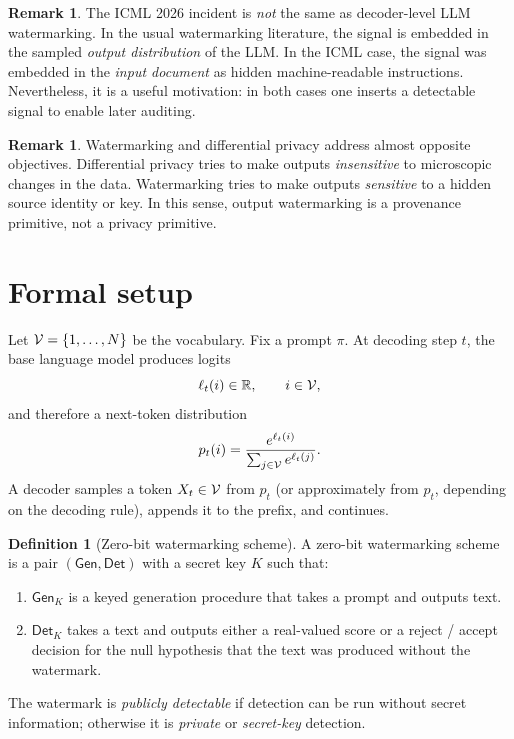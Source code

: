 \documentclass[11pt]{article}
\theoremstyle{definition}
\newtheorem{definition}[theorem]{Definition}
\newtheorem{remark}[theorem]{Remark}
\newcommand{\1}{\mathbf{1}}
\begin{document}
\begin{remark}
The ICML 2026 incident is \emph{not} the same as decoder-level LLM watermarking. In the usual watermarking literature, the signal is embedded in the sampled \emph{output distribution} of the LLM. In the ICML case, the signal was embedded in the \emph{input document} as hidden machine-readable instructions. Nevertheless, it is a useful motivation: in both cases one inserts a detectable signal to enable later auditing.
\end{remark}

\begin{remark}
Watermarking and differential privacy address almost opposite objectives. Differential privacy tries to make outputs \emph{insensitive} to microscopic changes in the data. Watermarking tries to make outputs \emph{sensitive} to a hidden source identity or key. In this sense, output watermarking is a provenance primitive, not a privacy primitive.
\end{remark}

\section{Formal setup}

Let ${\cal V} = \{1,\dots,N\}$ be the vocabulary. Fix a prompt $\pi$. At decoding step $t$, the base language model produces logits
\[
\ell_t(i) \in \mathbb{R}, \qquad i \in {\cal V},
\]
and therefore a next-token distribution
\[
p_t(i) = \frac{e^{\ell_t(i)}}{\sum_{j \in {\cal V}} e^{\ell_t(j)}}.
\]
A decoder samples a token $X_t \in {\cal V}$ from $p_t$ (or approximately from $p_t$, depending on the decoding rule), appends it to the prefix, and continues.

\begin{definition}[Zero-bit watermarking scheme]
A zero-bit watermarking scheme is a pair $(\mathsf{Gen},\mathsf{Det})$ with a secret key $K$ such that:
\begin{enumerate}
    \item $\mathsf{Gen}_K$ is a keyed generation procedure that takes a prompt and outputs text.
    \item $\mathsf{Det}_K$ takes a text and outputs either a real-valued score or a reject / accept decision for the null hypothesis that the text was produced without the watermark.
\end{enumerate}
The watermark is \emph{publicly detectable} if detection can be run without secret information; otherwise it is \emph{private} or \emph{secret-key} detection.
\end{definition}
\end{document}
